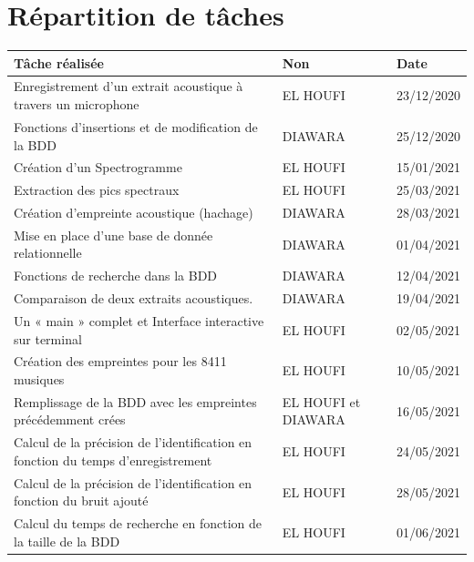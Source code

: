 \documentclass[11pt, report, french]{scrreprt}
\begin{document}
\section{Répartition de tâches}
\begin{center}
	\begin{tabular}{ | m{8.5cm} || m{3cm}| m{3cm}| } 
		\hline
		Tâche réalisée & Non & Date \\ 
		\hline
		\hline
		Enregistrement d’un extrait acoustique à travers un microphone & EL HOUFI & 23/12/2020\\ 
		\hline
		Fonctions d’insertions et de modification de la BDD & DIAWARA & 25/12/2020  \\ 
		\hline
		\hline
		Création d’un Spectrogramme & EL HOUFI &15/01/2021\\
		\hline
		\hline
		Extraction des pics spectraux & EL HOUFI &25/03/2021\\
		\hline
		\hline
		Création d’empreinte acoustique (hachage) & DIAWARA & 28/03/2021 \\
		\hline
		\hline
		Mise en place d’une base de donnée relationnelle & DIAWARA & 01/04/2021 \\
		\hline
		\hline
		Fonctions de recherche dans la BDD & DIAWARA & 12/04/2021\\
		\hline
		\hline
		Comparaison de deux extraits acoustiques. & DIAWARA & 19/04/2021\\
		\hline
		\hline
		Un  « main » complet et Interface interactive sur terminal & EL HOUFI & 02/05/2021\\
		\hline
		\hline
		Création des empreintes pour les 8411 musiques & EL HOUFI & 10/05/2021\\
		\hline
		\hline
		Remplissage de la BDD avec les empreintes précédemment crées & EL HOUFI et DIAWARA & 16/05/2021\\
		\hline
		\hline
		Calcul de la précision de l’identification en fonction du temps d’enregistrement & EL HOUFI & 24/05/2021\\
		\hline
		\hline
		Calcul de la précision de l’identification en fonction du bruit ajouté & EL HOUFI & 28/05/2021\\
		\hline
		\hline
		Calcul du temps de recherche en fonction de la taille de la BDD & EL HOUFI & 01/06/2021\\
		\hline
	\end{tabular}
\end{center}
\end{document}
